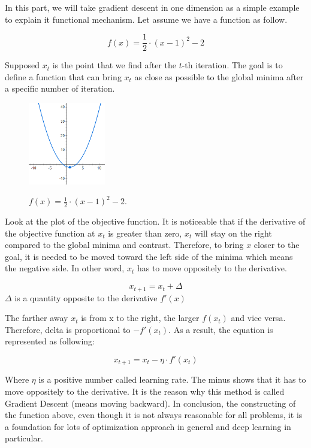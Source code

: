 	In this part, we will take gradient descent in one dimension as a simple example to explain it functional mechanism. Let assume we have a function as follow.
	
	\[f(x) = \frac{1}{2} \cdot (x - 1)^2 -2\]
	
	Supposed $x_t$ is the point that we find after the $t$-th iteration. The goal is to define a function that can bring $x_t$ as close as possible to the global minima after a specific number of iteration.
	
	\begin{figure}[H]
		\centering
		{\includegraphics[width=0.3\textwidth]{./hinhanh/chap3/simple_f(x).png}}
		\caption{$ f(x) = \frac{1}{2} \cdot (x - 1)^2 -2 $.}
	\end{figure}
	
	Look at the plot of the objective function. It is noticeable that if the derivative of the objective function at $x_t$ is greater than zero, $x_t$ will stay on the right compared to the global minima and contrast. Therefore, to bring $x$ closer to the goal, it is needed to be moved toward the left side of the minima which means the negative side. In other word, $x_t$ has to move oppositely to the derivative.  
	
	\[x_{t+1} = x_t + \Delta \] $\Delta$ is a quantity opposite to the derivative $f'(x)$
	
	\noindent	
	The farther away $x_t$ is from x to the right, the larger $f(x_t)$ and vice versa. Therefore, delta is proportional to $-f'(x_t)$.
	\noindent	
	As a result, the equation is represented as following:
	
	\[x_{t+1} = x_t - \eta \cdot f'(x_t)\]
	
	Where $\eta$ is a positive number called learning rate. The minus shows that it has to move oppositely to the derivative. It is the reason why this method is called Gradient Descent (means moving backward). In conclusion, the constructing of the function above, even though it is not always reasonable for all problems, it is a foundation for lots of optimization approach in general and deep learning in particular.
	
